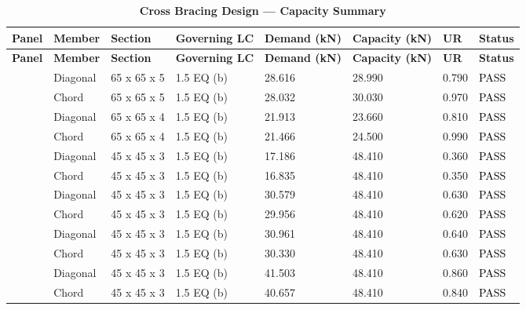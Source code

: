 \documentclass[12pt,a4paper]{report}
\numberwithin{table}{chapter}
\numberwithin{figure}{chapter}
\begin{document}
\vspace{1em}
\begin{longtable}{|C{2.0cm}|L{1.8cm}|C{2.2cm}|C{3.0cm}|C{1.8cm}|C{1.8cm}|C{1.2cm}|C{1.8cm}|}
\caption{\textbf{Cross Bracing Design --- Capacity Summary}}
\hline
\textbf{Panel} & \textbf{Member} & \textbf{Section} & \textbf{Governing LC} & \textbf{Demand (kN)} & \textbf{Capacity (kN)} & \textbf{UR} & \textbf{Status} \\[6pt]
\hline
\endfirsthead
\hline
\textbf{Panel} & \textbf{Member} & \textbf{Section} & \textbf{Governing LC} & \textbf{Demand (kN)} & \textbf{Capacity (kN)} & \textbf{UR} & \textbf{Status} \\[6pt]
\hline
\endhead
{} & Diagonal & 65 x 65 x 5 & 1.5 EQ (b) & 28.616 & 28.990 & 0.790 & \textcolor{black}{PASS} \\[6pt]
 & Chord & 65 x 65 x 5 & 1.5 EQ (b) & 28.032 & 30.030 & 0.970 & \textcolor{black}{PASS} \\[6pt]
\hline
{} & Diagonal & 65 x 65 x 4 & 1.5 EQ (b) & 21.913 & 23.660 & 0.810 & \textcolor{black}{PASS} \\[6pt]
 & Chord & 65 x 65 x 4 & 1.5 EQ (b) & 21.466 & 24.500 & 0.990 & \textcolor{black}{PASS} \\[6pt]
\hline
{} & Diagonal & 45 x 45 x 3 & 1.5 EQ (b) & 17.186 & 48.410 & 0.360 & \textcolor{black}{PASS} \\[6pt]
 & Chord & 45 x 45 x 3 & 1.5 EQ (b) & 16.835 & 48.410 & 0.350 & \textcolor{black}{PASS} \\[6pt]
\hline
{} & Diagonal & 45 x 45 x 3 & 1.5 EQ (b) & 30.579 & 48.410 & 0.630 & \textcolor{black}{PASS} \\[6pt]
 & Chord & 45 x 45 x 3 & 1.5 EQ (b) & 29.956 & 48.410 & 0.620 & \textcolor{black}{PASS} \\[6pt]
\hline
{} & Diagonal & 45 x 45 x 3 & 1.5 EQ (b) & 30.961 & 48.410 & 0.640 & \textcolor{black}{PASS} \\[6pt]
 & Chord & 45 x 45 x 3 & 1.5 EQ (b) & 30.330 & 48.410 & 0.630 & \textcolor{black}{PASS} \\[6pt]
\hline
{} & Diagonal & 45 x 45 x 3 & 1.5 EQ (b) & 41.503 & 48.410 & 0.860 & \textcolor{black}{PASS} \\[6pt]
 & Chord & 45 x 45 x 3 & 1.5 EQ (b) & 40.657 & 48.410 & 0.840 & \textcolor{black}{PASS} \\[6pt]

\end{longtable}
\end{document}
